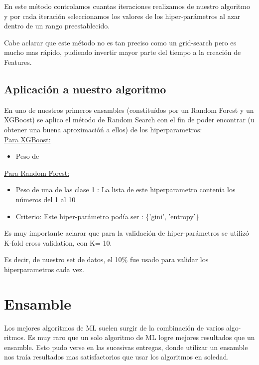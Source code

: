 \documentclass[a4paper ,12pt]{article}
\begin{document}
En este método controlamos cuantas iteraciones realizamos de nuestro algoritmo y por cada iteración seleccionamos los valores de los
hiper-parámetros al azar dentro de un rango preestablecido. 

Cabe aclarar que este método no es tan preciso como un grid-search pero es mucho mas rápido, pudiendo invertir mayor parte del tiempo a la creación de Features.

\subsection{Aplicación a nuestro algoritmo}

En uno de nuestros primeros ensambles (constituídos por un Random Forest y un XGBoost) se aplico el método de Random Search con el fin de poder encontrar (u obtener una buena aproximacióń a ellos) de los hiperparametros:\\

\underline{Para XGBoost: }

\begin{itemize}
	\item Peso de
\end{itemize}



\underline{Para Random Forest:}

\begin{itemize}
	
	\item Peso de una de las clase 1 : La lista de este hiperparametro contenía los números del 1 al 10
	
	\item Criterio: Este hiper-parámetro podía ser : \{'gini', 'entropy'\}

\end{itemize}


Es muy importante aclarar que para la validación de hiper-parámetros se utilizó K-fold cross validation, con K= 10.

Es decir, de nuestro set de datos, el 10\% fue usado para validar los hiperparametros cada vez.


\newpage
\section{Ensamble}

Los mejores algoritmos de ML suelen surgir de la combinación de varios algo-
ritmos. Es muy raro que un solo algoritmo de ML logre mejores resultados que
un ensamble. Esto pudo verse en las sucesivas entregas, donde utilizar un ensamble nos traía
resultados mas satisfactorios que usar los algoritmos en soledad.
\end{document}
